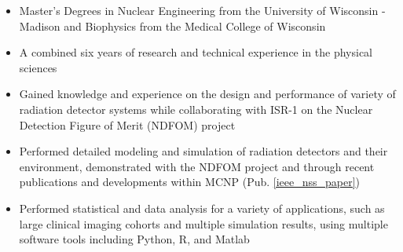 \begin{center}
\begin{minipage}{\textwidth}

  \begin{itemize}[leftmargin=.15in,rightmargin=.25in,itemsep=1.0mm]

	\item Master's Degrees in Nuclear Engineering from the University of Wisconsin - Madison and Biophysics from the Medical College of Wisconsin
	\item A combined six years of research and technical experience in the physical sciences
		
	\item Gained knowledge and experience on the design and performance of variety of radiation detector systems while collaborating with ISR-1 on the Nuclear Detection Figure of Merit (NDFOM) project
	
	\item Performed detailed modeling and simulation of radiation detectors and their environment, demonstrated with the NDFOM project and through recent publications and developments within \textsc{MCNP} (Pub. \ref{ieee_nss_paper})
	\item Performed statistical and data analysis for a variety of applications, such as large clinical imaging cohorts and multiple simulation results, using multiple software tools including Python, R, and Matlab
		

\end{itemize}
\end{minipage}
\end{center}
